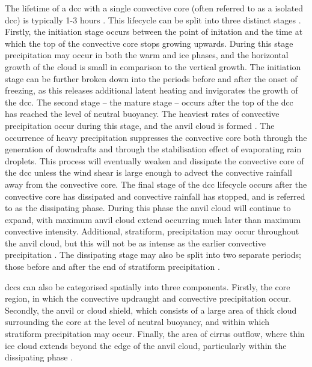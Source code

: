 The lifetime of a \acrshort{dcc} with a single convective core (often referred to as a isolated \acrshort{dcc}) is typically 1-3 hours \citep{chen_diurnal_1997}.
This lifecycle can be split into three distinct stages \citep{wall_life_2018}.
Firstly, the initiation stage occurs between the point of initation and the time at which the top of the convective core stops growing upwards.
During this stage precipitation may occur in both the warm and ice phases, and the horizontal growth of the cloud is small in comparison to the vertical growth.
The initiation stage can be further broken down into the periods before and after the onset of freezing, as this releases additional latent heating and invigorates the growth of the \acrshort{dcc}.
The second stage -- the mature stage -- occurs after the top of the \acrshort{dcc} has reached the level of neutral buoyancy.
The heaviest rates of convective precipitation occur during this stage, and the anvil cloud is formed \citep{houze_chapter_2014}.
The occurrence of heavy precipitation suppresses the convective core both through the generation of downdrafts and through the stabilisation effect of evaporating rain droplets.
This process will eventually weaken and dissipate the convective core of the \acrshort{dcc} unless the wind shear is large enough to advect the convective rainfall away from the convective core.
The final stage of the \acrshort{dcc} lifecycle occurs after the convective core has dissipated and convective rainfall has stopped, and is referred to as the dissipating phase.
During this phase the anvil cloud will continue to expand, with maximum anvil cloud extend occurring much later than maximum convective intensity.
Additional, stratiform, precipitation may occur throughout the anvil cloud, but this will not be as intense as the earlier convective precipitation \citep{houze_chapter_2014}.
The dissipating stage may also be split into two separate periods; those before and after the end of stratiform precipitation \citep{wall_life_2018}.

\acrshort{dcc}s can also be categorised spatially into three components.
Firstly, the core region, in which the convective updraught and convective precipitation occur.
Secondly, the anvil or cloud shield, which consists of a large area of thick cloud surrounding the core at the level of neutral buoyancy, and within which stratiform precipitation may occur.
Finally, the area of cirrus outflow, where thin ice cloud extends beyond the edge of the anvil cloud, particularly within the dissipating phase \citep{lilly_cirrus_1988}.

